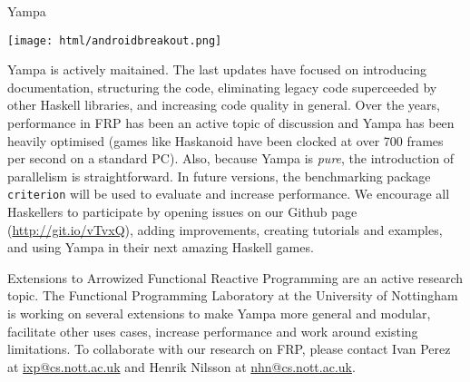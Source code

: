 \begin{hcarentry}[new]{Yampa}
\begin{center}
\texttt{[image: html/androidbreakout.png]}
\end{center}

Yampa is actively maitained. The last updates have focused on introducing
documentation, structuring the code, eliminating
legacy code superceeded by other Haskell libraries, and increasing code quality
in general. Over the years, performance in FRP has been an active topic of
discussion and Yampa has been heavily optimised (games like Haskanoid have been
clocked at over 700 frames per second on a standard PC). Also, because Yampa is
\emph{pure}, the introduction of parallelism is straightforward. In future
versions, the benchmarking package \texttt{criterion} will be used to evaluate
and increase performance. We encourage all Haskellers to participate by opening
issues on our Github page (\href{http://git.io/vTvxQ}{http://git.io/vTvxQ}),
adding improvements, creating tutorials and examples, and using Yampa in their
next amazing Haskell games.

Extensions to Arrowized Functional Reactive Programming are an active research
topic. The Functional Programming Laboratory at the University of Nottingham is
working on several extensions to make Yampa more general and modular,
facilitate other uses cases, increase performance and work around existing
limitations. To collaborate with our research on FRP, please contact Ivan Perez
at \href{mailto:ixp@cs.nott.ac.uk}{ixp@cs.nott.ac.uk} and Henrik
Nilsson at \href{mailto:nhn@cs.nott.ac.uk}{nhn@cs.nott.ac.uk}.

\end{hcarentry}
